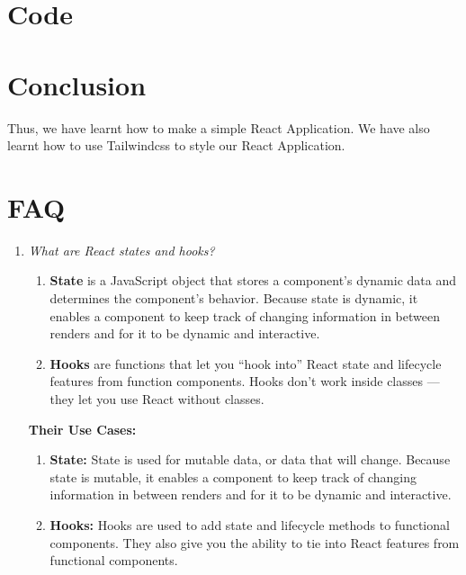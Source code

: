 \documentclass[11pt]{article}
\begin{document}
\section{Code}






\section{Conclusion}
Thus, we have learnt how to make a simple React Application. We have also learnt how to use Tailwindcss to style our React Application.
\clearpage

\section{FAQ}
\begin{enumerate}
    \item \textit{What are React states and hooks?}\\
          \begin{enumerate}
              \item \textbf{State} is a JavaScript object that stores a component's dynamic data and determines the component's behavior. Because state is dynamic, it enables a component to keep track of changing information in between renders and for it to be dynamic and interactive.
              \item \textbf{Hooks} are functions that let you “hook into” React state and lifecycle features from function components. Hooks don't work inside classes — they let you use React without classes.
          \end{enumerate}

          \textbf{Their Use Cases:}
          \begin{enumerate}
              \item   \textbf{State:} State is used for mutable data, or data that will change. Because state is mutable, it enables a component to keep track of changing information in between renders and for it to be dynamic and interactive.
              \item  \textbf{Hooks:} Hooks are used to add state and lifecycle methods to functional components. They also give you the ability to tie into React features from functional components.
          \end{enumerate}

\end{enumerate}
\end{document}
